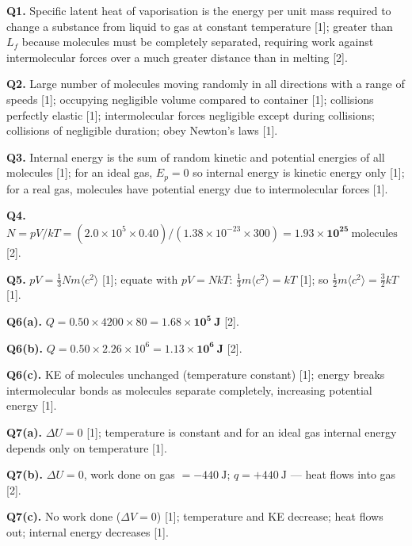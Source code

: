 \begin{markscheme}

\textbf{Q1.} Specific latent heat of vaporisation is the energy per unit mass required to change a substance from liquid to gas at constant temperature [1]; greater than $L_f$ because molecules must be completely separated, requiring work against intermolecular forces over a much greater distance than in melting [2].

\vspace{0.5em}\textbf{Q2.} Large number of molecules moving randomly in all directions with a range of speeds [1]; occupying negligible volume compared to container [1]; collisions perfectly elastic [1]; intermolecular forces negligible except during collisions; collisions of negligible duration; obey Newton's laws [1].

\vspace{0.5em}\textbf{Q3.} Internal energy is the sum of random kinetic and potential energies of all molecules [1]; for an ideal gas, $E_p = 0$ so internal energy is kinetic energy only [1]; for a real gas, molecules have potential energy due to intermolecular forces [1].

\vspace{0.5em}\textbf{Q4.} $N = pV/kT = (2.0\times10^5 \times 0.40)/(1.38\times10^{-23} \times 300) = \mathbf{1.93\times10^{25}}\ \text{molecules}$ [2].

\vspace{0.5em}\textbf{Q5.} $pV = \tfrac{1}{3}Nm\langle c^2\rangle$ [1]; equate with $pV = NkT$: $\tfrac{1}{3}m\langle c^2\rangle = kT$ [1]; so $\tfrac{1}{2}m\langle c^2\rangle = \tfrac{3}{2}kT$ [1].

\vspace{0.5em}\textbf{Q6(a).} $Q = 0.50 \times 4200 \times 80 = \mathbf{1.68\times10^5\ \text{J}}$ [2].

\vspace{0.5em}\textbf{Q6(b).} $Q = 0.50 \times 2.26\times10^6 = \mathbf{1.13\times10^6\ \text{J}}$ [2].

\vspace{0.5em}\textbf{Q6(c).} KE of molecules unchanged (temperature constant) [1]; energy breaks intermolecular bonds as molecules separate completely, increasing potential energy [1].

\vspace{0.5em}\textbf{Q7(a).} $\Delta U = 0$ [1]; temperature is constant and for an ideal gas internal energy depends only on temperature [1].

\vspace{0.5em}\textbf{Q7(b).} $\Delta U = 0$, work done on gas $= -440\ \text{J}$; $q = +440\ \text{J}$ --- heat flows into gas [2].

\vspace{0.5em}\textbf{Q7(c).} No work done ($\Delta V = 0$) [1]; temperature and KE decrease; heat flows out; internal energy decreases [1].

\end{markscheme}

